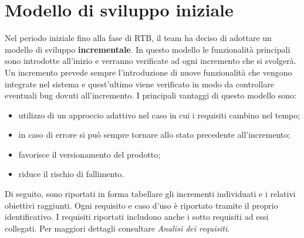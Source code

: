 \section{Modello di sviluppo iniziale}
Nel periodo iniziale fino alla fase di RTB, il team ha deciso di adottare un modello di sviluppo \textbf{incrementale}. In questo
modello le funzionalità principali sono introdotte all'inizio e verranno verificate 
ad ogni incremento che si svolgerà. Un incremento prevede sempre l'introduzione di nuove
funzionalità che vengono integrate nel sistema e quest'ultimo viene verificato in modo da
controllare eventuali bug dovuti all'incremento. I principali vantaggi di questo modello sono:
\begin{itemize}
    \item utilizzo di un approccio adattivo nel caso in cui i requisiti cambino nel tempo;
    \item in caso di errore si può sempre tornare allo stato precedente all'incremento;
    \item favorisce il versionamento del prodotto;
    \item riduce il rischio di fallimento.
\end{itemize} 
Di seguito, sono riportati in forma tabellare gli incrementi individuati e i relativi obiettivi raggiunti. Ogni requisito
e caso d'uso è riportato tramite il proprio identificativo. I requisiti riportati includono anche i sotto requisiti ad essi collegati.
Per maggiori dettagli consultare \textit{Analisi dei requisiti}.

\renewcommand{\arraystretch}{1.8}


